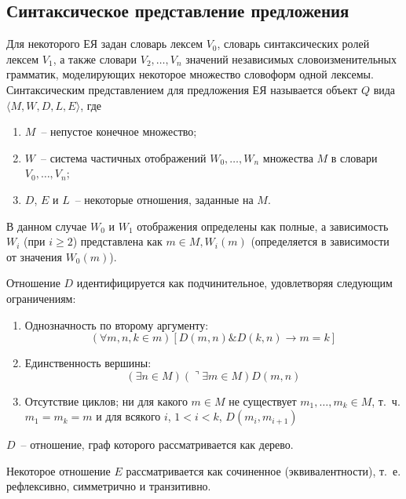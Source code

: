 \documentclass[a4paper,14pt,russian]{extreport}
\begin{document}
\subsection{Синтаксическое представление предложения}

Для некоторого ЕЯ задан словарь лексем $V_0$, словарь синтаксических ролей лексем $V_1$, а также словари $V_2,\dots,V_n$ значений независимых словоизменительных грамматик, моделирующих некоторое множество словоформ одной лексемы. Синтаксическим представлением для предложения ЕЯ называется объект $Q$ вида $\langle M, W, D, L, E\rangle$, где

\begin{enumerate}
\item $M$~-- непустое конечное множество;
\item $W$~-- система частичных отображений $W_0,\dots,W_n$ множества $M$ в словари $V_0,\dots,V_n$;
\item $D$, $E$ и $L$~-- некоторые отношения, заданные на $M$.
\end{enumerate}

В данном случае $W_0$ и $W_1$ отображения определены как полные, а зависимость $W_i$ (при $i\geq 2$) представлена как $m\in M, W_i\left(m\right)$ (определяется в зависимости от  значения $W_0\left(m\right)$).

Отношение $D$ идентифицируется как подчинительное, удовлетворяя следующим ограничениям:

\begin{enumerate}
\item Однозначность по второму аргументу:
\begin{equation}
\left(\forall m, n, k\in m\right) \left[D\left(m, n\right)\&D\left(k, n\right)\rightarrow m=k\right]
\end{equation}
\item Единственность вершины:
\begin{equation}
\left(\exists n\in M\right)\left(\urcorner\exists m\in M\right)D\left(m, n\right)
\end{equation}
\item Отсутствие циклов; ни для какого $m\in M$ не существует $m_1,\dots,m_k\in M$, т.~ч. $m_1=m_k=m$ и для всякого $i$, $1<i<k$, $D\left(m_i,m_{i+1}\right)$
\end{enumerate}

$D$~-- отношение, граф которого рассматривается как дерево.

Некоторое отношение $E$ рассматривается как сочиненное (эквивалентности), т.~е. рефлексивно, симметрично и транзитивно.
\end{document}
